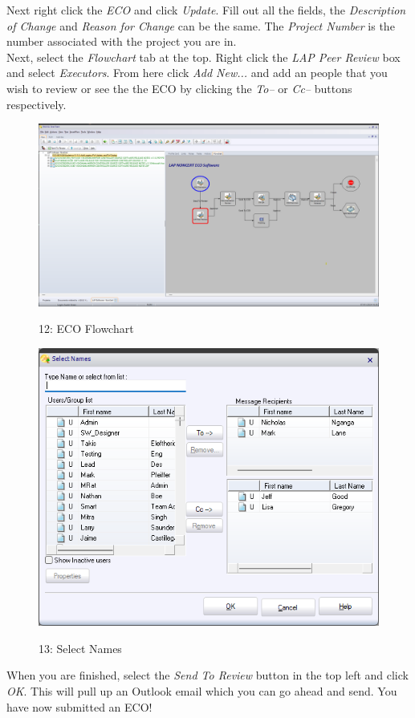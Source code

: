 \documentclass[10pt]{article}
\begin{document}
                Next right click the \emph{ECO} and click \emph{Update}. Fill out all the fields, the \emph{Description of Change} and \emph{Reason for Change} can be the same. The \emph{Project Number} is the number associated with the project you are in. \\
                Next, select the \emph{Flowchart} tab at the top. Right click the \emph{LAP Peer Review} box and select \emph{Executors}. From here click \emph{Add New...} and add an people that you wish to review or see the the ECO by clicking the \emph{To--} or \emph{Cc--} buttons respectively.
                \begin{figure}[H]
                    \centerline{\includegraphics[width=\textwidth]{References/ST ECO Flowchart.png}}
                    \figurename{ 12: ECO Flowchart}
                \end{figure}
                \begin{figure}[H]
                    \centerline{\includegraphics[width=\textwidth]{References/ST ECO Select Names.png}}
                    \figurename{ 13: Select Names}
                \end{figure}
                When you are finished, select the \emph{Send To Review} button in the top left and click \emph{OK}. This will pull up an Outlook email which you can go ahead and send. You have now submitted an ECO!
\end{document}
